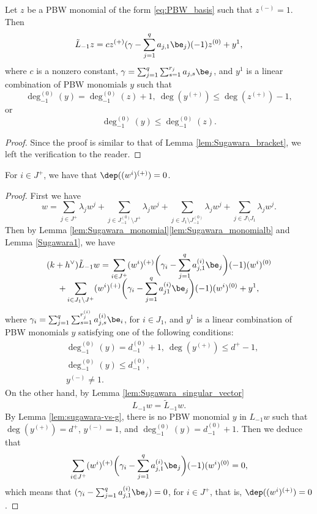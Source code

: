 \begin{lem}\label{Sugawara1}
Let $z$ be a PBW monomial of the form \eqref{eq:PBW_basis}
such that $z^{(-)}=1$. Then
\begin{equation*}
\tilde{L}_{-1}z
= c z^{(+)}(\gamma-\sum_{j=1}^qa_{j,1}\be_j)(-1)z^{(0)}+y^1,
\end{equation*}
where $c$ is a nonzero constant,
$\gamma=\sum_{j=1}^q\sum_{s=1}^{r_j}a_{j,s}\be_j$, and
$y^1$ is a linear combination of PBW monomials $y$ such that
\[
\deg_{-1}^{(0)}(y)=\deg_{-1}^{(0)}(z)+1, \ \deg(y^{(+)})\leq \deg(z^{(+)})-1,
\]
or
\[
\deg_{-1}^{(0)}(y)\leq \deg_{-1}^{(0)}(z).
\]
\end{lem}
\begin{proof}
Since the proof is similar to that of Lemma \ref{lem:Sugawara_bracket},
we left the verification to the reader.
\end{proof}

{
\begin{lem}\label{lem:wi_+}
For $i\in J^+$, we have that $\dep((w^i)^{(+)})=0$.
\end{lem}
\begin{proof} First we have
\[
w = \sum_{j \in J^+} \lambda_j w^j+\sum_{j \in J_{-1}^{(0)}\setminus J^+} \lambda_j w^j+\sum_{j \in J_1\setminus J_{-1}^{(0)}} \lambda_j w^j+\sum_{j \in J\setminus J_1} \lambda_j w^j.
\]
Then by Lemma \ref{lem:Sugawara_monomial}\eqref{lem:Sugawara_monomialb} and Lemma \ref{Sugawara1}, we have
\begin{multline*}
(k+h^{\vee})\tilde{L}_{-1}w
=\sum_{i\in J^+}(w^i)^{(+)} \biggl(\gamma_i-\sum_{j=1}^q
a_{j,1}^{(i)}\be_j\biggr)(-1)(w^i)^{(0)}\\[-8pt]
+\sum_{i\in J_1\setminus J^+}(w^i)^{(+)}\biggl(\gamma_i-\sum_{j=1}^qa^{(i)}_{j1}\be_j\biggr)(-1)(w^i)^{(0)}+y^1,
\end{multline*}
where
{$\gamma_i=\sum_{j=1}^q\sum_{s=1}^{r^{(i)}_j}a^{(i)}_{j,s}\be_i$},
for $i\in J_1$, and $y^1$ is a linear combination of PBW monomials $y$ satisfying
one of the following conditions:
\begin{align*}
& \deg_{-1}^{(0)}(y)=d_{-1}^{(0)}+1, \ \deg(y^{(+)})\leq d^+-1,\\
& \deg_{-1}^{(0)}(y)\leq d_{-1}^{(0)},\\
& y^{(-)}\neq 1.
\end{align*}
On the other hand, by Lemma \ref{lem:Sugawara_singular_vector}
\[
L_{-1}w=\tilde{L}_{-1}w.
\]
By Lemma \ref{lem:sugawara-vs-g}, there is no PBW monomial $y$ in $L_{-1}w$ such that $\deg(y^{(+)})=d^+$, $y^{(-)}=1$, and $\deg_{-1}^{(0)}(y)=d_{-1}^{(0)}+1$. Then we deduce that
\[
\sum_{i\in J^+}(w^i)^{(+)}\biggl(\gamma_i-\sum_{j=1}^qa_{j,1}^{(i)}\be_j\biggr)(-1)(w^i)^{(0)}=0,
\]
which means that ${(\gamma_i-\sum_{j=1}^qa_{j,1}^{(i)}\be_j)}=0$, for $i\in J^+$, that is, $\dep((w^i)^{(+)})=0$.
\end{proof}}

